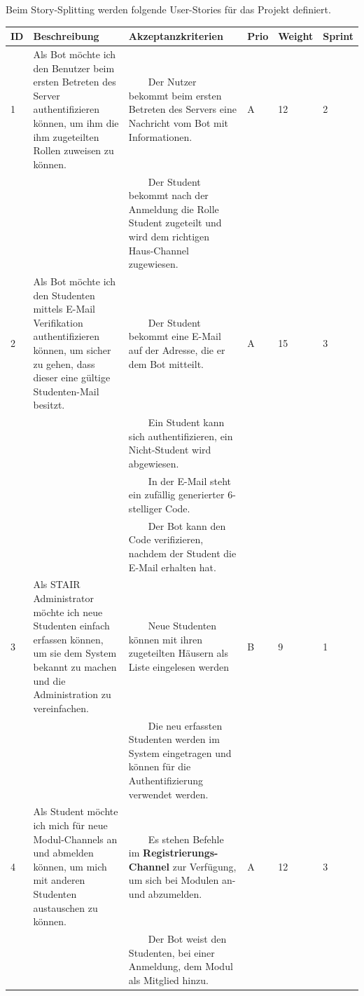 \documentclass[a4paper, table]{article}
\newcommand{\tabitem}{~~\llap{\textbullet}~~}
\begin{document}
Beim Story-Splitting werden folgende User-Stories für das Projekt definiert.

\begin{longtable}{ | p{1em} | p{16em} | p{13em} | p{2em} | p{3em} | p{2em} |}
    \hline
    \rowcolor[gray]{.9} ID & Beschreibung & Akzeptanzkriterien & Prio & Weight & Sprint \\
    \hline
    1 & Als Bot möchte ich den Benutzer beim ersten Betreten des Server authentifizieren können,
    um ihm die ihm zugeteilten Rollen zuweisen zu können. &
    \tabitem Der Nutzer bekommt beim ersten Betreten des Servers eine Nachricht vom Bot mit Informationen. & A & 12 & 2 \\*
    & & \tabitem Der Student bekommt nach der Anmeldung die Rolle Student zugeteilt und wird dem richtigen Haus-Channel zugewiesen. & & & \\
    \hline
    2 & Als Bot möchte ich den Studenten mittels E-Mail Verifikation authentifizieren können,
    um sicher zu gehen, dass dieser eine gültige Studenten-Mail besitzt. &
    \tabitem Der Student bekommt eine E-Mail auf der Adresse, die er dem Bot mitteilt. & A & 15 & 3 \\*
     & & \tabitem Ein Student kann sich authentifizieren, ein Nicht-Student wird abgewiesen. & & & \\*
     & & \tabitem In der E-Mail steht ein zufällig generierter 6-stelliger Code. & & & \\*
     & & \tabitem Der Bot kann den Code verifizieren, nachdem der Student die E-Mail erhalten hat. & & & \\
    \hline
    3 & Als STAIR Administrator möchte ich neue Studenten einfach erfassen können,
    um sie dem System bekannt zu machen und die Administration zu vereinfachen. &
    \tabitem Neue Studenten können mit ihren zugeteilten Häusern als Liste eingelesen werden & B & 9 & 1 \\*
     & & \tabitem Die neu erfassten Studenten werden im System eingetragen und können für die Authentifizierung verwendet werden. & & & \\
    \hline
    4 & Als Student möchte ich mich für neue Modul-Channels an und abmelden können,
    um mich mit anderen Studenten austauschen zu können. &
    \tabitem Es stehen Befehle im \textbf{Registrierungs-Channel} zur Verfügung, um sich bei Modulen an- und abzumelden. & A & 12 & 3 \\*
     & & \tabitem Der Bot weist den Studenten, bei einer Anmeldung, dem Modul als Mitglied hinzu. & & & \\*

\end{longtable}
\end{document}
